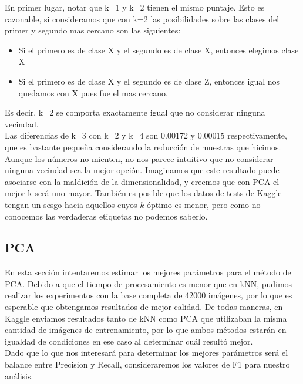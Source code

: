 En primer lugar, notar que k=1 y k=2 tienen el mismo puntaje. Esto es razonable, si consideramos que con k=2 las posibilidades sobre las clases del primer y segundo mas cercano son las siguientes: \\
\begin{itemize}
\item Si el primero es de clase X y el segundo es de clase X, entonces elegimos clase X
\item Si el primero es de clase X y el segundo es de clase Z, entonces igual nos quedamos con X pues fue el mas cercano.
\end{itemize}

Es decir, k=2 se comporta exactamente igual que no considerar ninguna vecindad. \\

Las diferencias de k=3 con k=2 y k=4 son 0.00172 y 0.00015 respectivamente, que es bastante pequeña considerando la reducción de muestras que hicimos. \\

Aunque los números no mienten, no nos parece intuitivo que no considerar ninguna vecindad sea la mejor opción. Imaginamos que este resultado puede asociarse con la maldición de la dimensionalidad, y creemos que con PCA el mejor k será uno mayor. También es posible que los datos de tests de Kaggle tengan un sesgo hacia aquellos cuyos $k$ óptimo es menor, pero como no conocemos las verdaderas etiquetas no podemos saberlo. \\


\subsection{PCA}

En esta sección intentaremos estimar los mejores parámetros para el método de PCA. Debido a que el tiempo de procesamiento es menor que en kNN, pudimos realizar los experimentos con la base completa de 42000 imágenes, por lo que es esperable que obtengamos resultados de mejor calidad. De todas maneras, en Kaggle enviamos resultados tanto de kNN como PCA que utilizaban la misma cantidad de imágenes de entrenamiento, por lo que ambos métodos estarán en igualdad de condiciones en ese caso al determinar cuál resultó mejor. \\

Dado que lo que nos interesará para determinar los mejores parámetros será el balance entre Precision y Recall, consideraremos los valores de F1 para nuestro análisis.  \\

